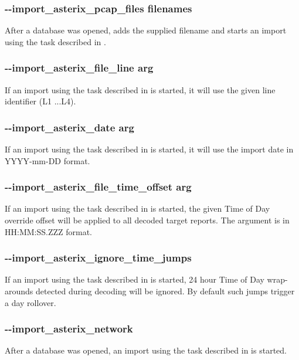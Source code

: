 \subsubsection{-{}-import\_asterix\_pcap\_files filenames}

After a database was opened, adds the supplied filename and starts an import using the task described in .

\subsubsection{-{}-import\_asterix\_file\_line arg}

If an import using the task described in  is started, it will use the given line identifier (L1 ...L4).


\subsubsection{-{}-import\_asterix\_date arg}

If an import using the task described in  is started, it will use the import date in YYYY-mm-DD format.

\subsubsection{-{}-import\_asterix\_file\_time\_offset arg}

If an import using the task described in  is started, the given Time of Day override offset will be applied to all decoded target reports. The argument is in HH:MM:SS.ZZZ format.

\subsubsection{-{}-import\_asterix\_ignore\_time\_jumps}

If an import using the task described in  is started, 24 hour Time of Day wrap-arounds detected during decoding will be ignored. By default such jumps trigger a day rollover.

\subsubsection{-{}-import\_asterix\_network}

After a database was opened, an import using the task described in  is started.

